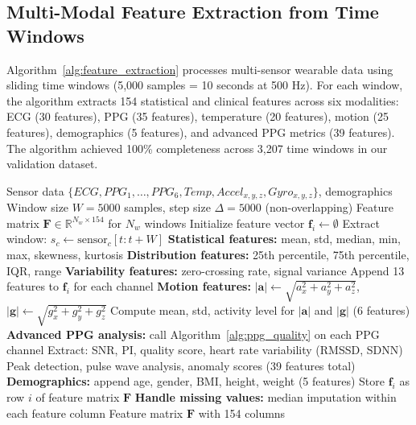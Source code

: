 \documentclass[3p,times,procedia]{elsarticle}
\begin{document}
\subsection{Multi-Modal Feature Extraction from Time Windows}
\vspace{-2pt}

Algorithm~\ref{alg:feature_extraction} processes multi-sensor wearable data using sliding time windows (5,000 samples = 10 seconds at 500 Hz). For each window, the algorithm extracts 154 statistical and clinical features across six modalities: ECG (30 features), PPG (35 features), temperature (20 features), motion (25 features), demographics (5 features), and advanced PPG metrics (39 features). The algorithm achieved 100\% completeness across 3,207 time windows in our validation dataset.

\begin{algorithm}[H]\footnotesize\setlength{\abovecaptionskip}{-2pt}
\caption{Multi-Modal Feature Extraction}
\label{alg:feature_extraction}
\begin{algorithmic}[1]
    \Require Sensor data $\{ECG, PPG_1, \ldots, PPG_6, Temp, Accel_{x,y,z}, Gyro_{x,y,z}\}$, demographics
    \Require Window size $W = 5000$ samples, step size $\Delta = 5000$ (non-overlapping)
    \Ensure Feature matrix $\mathbf{F} \in \mathbb{R}^{N_w \times 154}$ for $N_w$ windows
        \State Initialize feature vector $\mathbf{f}_i \gets \emptyset$
            \State Extract window: $s_c \gets \text{sensor}_c[t : t+W]$
            \State \textbf{Statistical features:} mean, std, median, min, max, skewness, kurtosis
            \State \textbf{Distribution features:} 25th percentile, 75th percentile, IQR, range
            \State \textbf{Variability features:} zero-crossing rate, signal variance
            \State Append 13 features to $\mathbf{f}_i$ for each channel
        \EndFor
        \State \textbf{Motion features:}
        \State \quad $|\mathbf{a}| \gets \sqrt{a_x^2 + a_y^2 + a_z^2}$, $|\mathbf{g}| \gets \sqrt{g_x^2 + g_y^2 + g_z^2}$
        \State \quad Compute mean, std, activity level for $|\mathbf{a}|$ and $|\mathbf{g}|$ (6 features)
        \State \textbf{Advanced PPG analysis:} call Algorithm~\ref{alg:ppg_quality} on each PPG channel
        \State \quad Extract: SNR, PI, quality score, heart rate variability (RMSSD, SDNN)
        \State \quad Peak detection, pulse wave analysis, anomaly scores (39 features total)
        \State \textbf{Demographics:} append age, gender, BMI, height, weight (5 features)
        \State Store $\mathbf{f}_i$ as row $i$ of feature matrix $\mathbf{F}$
    \EndFor
    \State \textbf{Handle missing values:} median imputation within each feature column
    \State \Return Feature matrix $\mathbf{F}$ with 154 columns
\end{algorithmic}
\end{algorithm}
\end{document}
